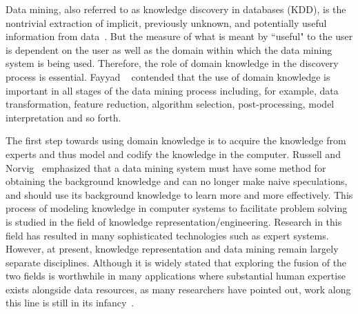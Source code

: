 Data mining, also referred to as knowledge discovery in databases (KDD), is the nontrivial extraction of implicit, previously unknown, and potentially useful information from data~\cite{Frawley1992}. But the measure of what is meant by ``useful" to the user is dependent on the user as well as the domain within which the data mining system is being used. Therefore, the role of domain knowledge in the discovery process is essential. Fayyad \etal~\cite{Fayyad96} contended that the use of domain knowledge is important in all stages of the data mining process including, for example, data transformation, feature reduction, algorithm selection, post-processing, model interpretation and so forth.

The first step towards using domain knowledge is to acquire the knowledge from experts and thus model and codify the knowledge in the computer. Russell and Norvig~\cite{Russell03} emphasized that a data mining system must have some method for obtaining the background knowledge and can no longer make naive speculations, and should use its background knowledge to learn more and more effectively. This process of modeling knowledge in computer systems to facilitate problem solving is studied in the field of knowledge representation/engineering. Research in this field has resulted in many sophisticated technologies such as expert systems. However, at present, knowledge representation and data mining remain largely separate disciplines. Although it is widely stated that exploring the fusion of the two fields is worthwhile in many applications where substantial human expertise exists alongside data resources, as many researchers have pointed out, work along this line is still in its infancy~\cite{Hirsh94, Weiss01, Daniels01, Kopanas02, Langseth03}.


